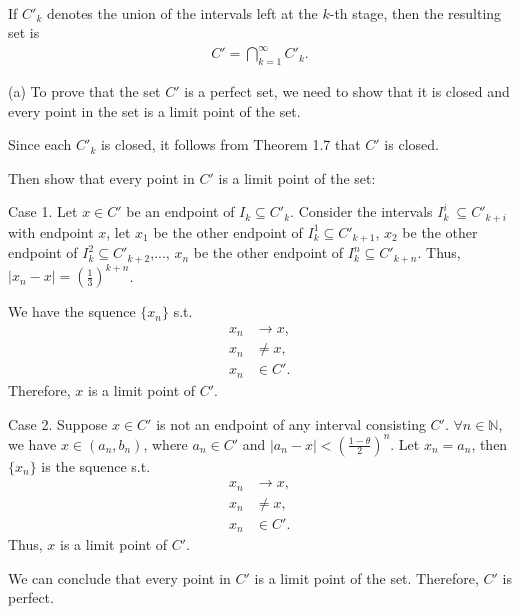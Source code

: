 \documentclass[UTF8,a4paper,10pt]{article}
\begin{document}
  \begin{solution}\,

  If \(C'_k\) denotes the union of the intervals left at the
$k$-th stage, then the resulting set is
\begin{equation*}
  \begin{aligned}
    C' =  \bigcap_{k=1}^{\infty} C'_k  .
  \end{aligned}
\end{equation*}


  (a) To prove that the set \(C'\) is a perfect set, we need to show that it is closed and every point in the set is a limit point of the set.

  Since each \(C'_k\) is closed, it follows from Theorem 1.7 that \(C'\) is closed. 

  Then show that every point in \(C'\) is a limit point of the set:

  Case 1. Let \(x\in C'\) be an endpoint of \(I_k\subseteq C'_k\). Consider the intervals \(I_k^i\ \subseteq C'_{k+i}\) with endpoint \(x\), let \(x_1\) be the other endpoint of \(I_k^1\subseteq C'_{k+1}\), \(x_2\) be the other endpoint of \(I_k^2\subseteq C'_{k+2}\),..., \(x_n\) be the other endpoint of \(I_k^n
  \subseteq C'_{k+n}\).
  Thus, \(|x_n-x|=(\frac{1}{3})^{k+n}\).

  We have the squence \(\{x_n\}\) s.t. 
  \begin{equation*}
    \begin{aligned}
      x_n&\to x,\\
      x_n&\neq x,\\
      x_n&\in C'.
    \end{aligned}
  \end{equation*}
  Therefore, \(x\) is a limit point of \(C'\).

  Case 2. Suppose \(x\in C'\) is not an endpoint of any interval consisting \(C'\). \(\forall n\in\mathbb{N}\), we have \(x\in (a_n, b_n)\), where \(a_n\in C'\) and \(|a_n-x|<(\frac{1-\theta}{2})^{n}\). Let \(x_n = a_n\), then \(\{x_n\}\) is the squence s.t. 
  \begin{equation*}
    \begin{aligned}
      x_n&\to x,\\
      x_n&\neq x,\\
      x_n&\in C'.
    \end{aligned}
  \end{equation*}
  Thus, \(x\) is a limit point of \(C'\).

  We can conclude that every point in \(C'\) is a limit point of the set. Therefore, \(C'\) is perfect.


\end{solution}
\end{document}
